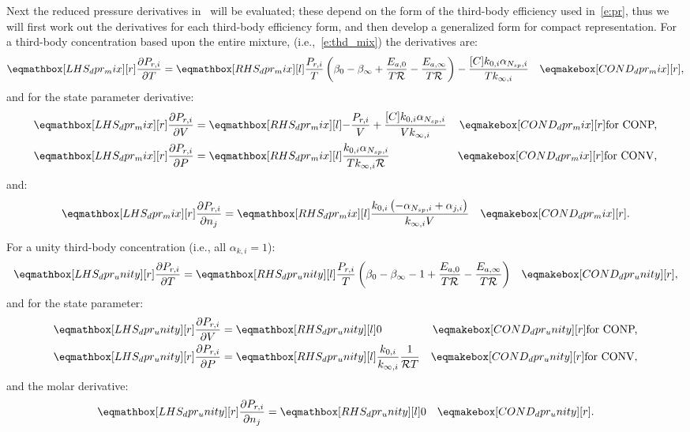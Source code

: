 \documentclass[12pt,number,sort&compress]{elsarticle}
\newcommand{\ns}{N_{sp}}
\newcommand{\conp}{CONP}
\newcommand{\conv}{CONV}
\newcommand{\dconp}{\ifmmode\text{for \conp,}\else for \conp,\fi}
\newcommand{\dconv}{\ifmmode\text{for \conv,}\else for \conv,\fi}
\newcommand{\Ru}{\mathcal{R}}
\begin{document}
Next the reduced pressure derivatives in~ will be evaluated; these depend on the form of the third-body efficiency used in~\cref{e:pr}, thus we will first work out the derivatives for each third-body efficiency form, and then develop a generalized form for compact representation.
For a third-body concentration based upon the entire mixture, (i.e.,~\cref{e:thd_mix}) the derivatives are:
\begin{align}
 \lhs{dpr_mix}{\frac{\partial P_{r, i} }{\partial T }} &= \rhs{dpr_mix}{\frac{P_{r, i}}{T} \left(\beta_{0} - \beta_{\infty} + \frac{E_{a, 0}}{T \Ru} - \frac{E_{a, \infty}}{T \Ru}\right) - \frac{[C] k_{0, i} \alpha_{\ns,i}}{T k_{\infty, i}}} & \cond{dpr_mix}{,} \label{e:dpr_mix_dt}
\end{align}
and for the state parameter derivative:
\begin{subequations}
 \label{e:dpr_mix_de}
 \begin{align}
  \lhs{dpr_mix}{\frac{\partial P_{r, i} }{\partial V }} &= \rhs{dpr_mix}{- \frac{P_{r, i}}{V} + \frac{[C] k_{0, i} \alpha_{\ns,i}}{V k_{\infty, i}}} & \cond{dpr_mix}{\dconp} \\
  \lhs{dpr_mix}{\frac{\partial P_{r, i} }{\partial P }} &= \rhs{dpr_mix}{\frac{k_{0, i} \alpha_{\ns,i}}{T k_{\infty, i} \Ru}} & \cond{dpr_mix}{\dconv}
 \end{align}
\end{subequations}
and:
\begin{align}
 \lhs{dpr_mix}{\frac{\partial P_{r, i} }{\partial n_j }} &= \rhs{dpr_mix}{\frac{k_{0, i} \left(- \alpha_{\ns,i} + \alpha_{j,i}\right)}{k_{\infty, i} V}} & \cond{dpr_mix}{.} \label{e:dpr_mix_dnj}
\end{align}


For a unity third-body concentration (i.e., all $\alpha_{k,i}=1$):
\begin{align}
 \lhs{dpr_unity}{\frac{\partial P_{r, i} }{\partial T }} &= \rhs{dpr_unity}{\frac{P_{r, i}}{T} \left(\beta_{0} - \beta_{\infty} - 1 + \frac{E_{a, 0}}{T \Ru} - \frac{E_{a, \infty}}{T \Ru}\right)} & \cond{dpr_unity}{,} \label{e:dpr_unity_dt}
\end{align}
and for the state parameter:
\begin{subequations}
 \label{e:dpr_unity_de}
 \begin{align}
  \lhs{dpr_unity}{\frac{\partial P_{r, i} }{\partial V }} &= \rhs{dpr_unity}{0} & \cond{dpr_unity}{\dconp}\\
  \lhs{dpr_unity}{\frac{\partial P_{r, i} }{\partial P }} &= \rhs{dpr_unity}{\frac{k_{0, i}}{k_{\infty, i}} \frac{1}{\Ru T}} & \cond{dpr_unity}{\dconv}
 \end{align}
\end{subequations}
and the molar derivative:
\begin{align}
 \lhs{dpr_unity}{\frac{\partial P_{r, i} }{\partial n_j }} &= \rhs{dpr_unity}{0} & \cond{dpr_unity}{.} \label{e:dpr_unity_dnj}
\end{align}
\end{document}
